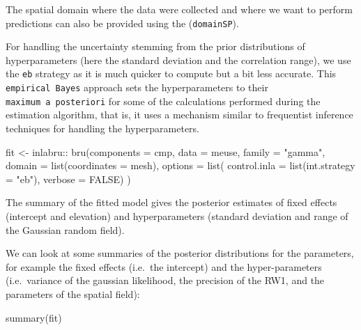 \documentclass[
  a4paper,
]{article}
\newenvironment{Shaded}{\begin{snugshade}}{\end{snugshade}}
\newcommand{\AttributeTok}[1]{\textcolor[rgb]{0.40,0.45,0.13}{#1}}
\newcommand{\ConstantTok}[1]{\textcolor[rgb]{0.56,0.35,0.01}{#1}}
\newcommand{\FunctionTok}[1]{\textcolor[rgb]{0.28,0.35,0.67}{#1}}
\newcommand{\NormalTok}[1]{\textcolor[rgb]{0.00,0.23,0.31}{#1}}
\newcommand{\OtherTok}[1]{\textcolor[rgb]{0.00,0.23,0.31}{#1}}
\newcommand{\SpecialCharTok}[1]{\textcolor[rgb]{0.37,0.37,0.37}{#1}}
\newcommand{\StringTok}[1]{\textcolor[rgb]{0.13,0.47,0.30}{#1}}
\begin{document}
The spatial domain where the data were collected and where we want to
perform predictions can also be provided using the (\texttt{domainSP}).

For handling the uncertainty stemming from the prior distributions of
hyperparameters (here the standard deviation and the correlation range),
we use the \texttt{eb} strategy as it is much quicker to compute but a
bit less accurate. This \texttt{empirical\ Bayes} approach sets the
hyperparameters to their \texttt{maximum\ a\ posteriori} for some of the
calculations performed during the estimation algorithm, that is, it uses
a mechanism similar to frequentist inference techniques for handling the
hyperparameters.

\begin{Shaded}
\begin{Highlighting}[]
\NormalTok{fit }\OtherTok{\textless{}{-}}\NormalTok{ inlabru}\SpecialCharTok{::} \FunctionTok{bru}\NormalTok{(}\AttributeTok{components =}\NormalTok{ cmp,}
           \AttributeTok{data =}\NormalTok{ meuse,}
           \AttributeTok{family =} \StringTok{"gamma"}\NormalTok{,}
           \AttributeTok{domain =} \FunctionTok{list}\NormalTok{(}\AttributeTok{coordinates =}\NormalTok{ mesh),}
           \AttributeTok{options =} \FunctionTok{list}\NormalTok{(}
             \AttributeTok{control.inla =} \FunctionTok{list}\NormalTok{(}\AttributeTok{int.strategy =} \StringTok{"eb"}\NormalTok{),}
             \AttributeTok{verbose =} \ConstantTok{FALSE}\NormalTok{)}
\NormalTok{           )}
\end{Highlighting}
\end{Shaded}

The summary of the fitted model gives the posterior estimates of fixed
effects (intercept and elevation) and hyperparameters (standard
deviation and range of the Gaussian random field).

We can look at some summaries of the posterior distributions for the
parameters, for example the fixed effects (i.e.~the intercept) and the
hyper-parameters (i.e.~variance of the gaussian likelihood, the
precision of the RW1, and the parameters of the spatial field):

\begin{Shaded}
\begin{Highlighting}[]
\FunctionTok{summary}\NormalTok{(fit)}
\end{Highlighting}
\end{Shaded}
\end{document}
